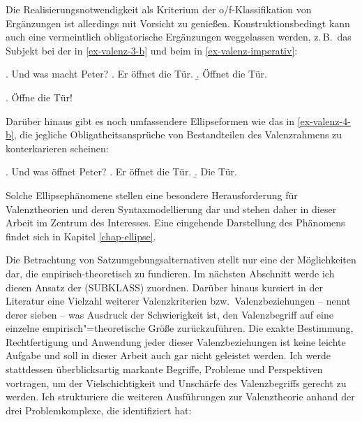 Die Realisierungsnotwendigkeit als Kriterium der o/f-Klassifikation von Ergänzungen ist allerdings mit Vorsicht zu genießen. Konstruktionsbedingt kann auch eine vermeintlich obligatorische Ergänzungen weggelassen werden, z.\,B.\ das Subjekt bei der  in \ref{ex-valenz-3-b} und beim  in \ref{ex-valenz-imperativ}:

\ex. Und was macht Peter? 
\a. Er öffnet die Tür.
\b. Öffnet die Tür.  \label{ex-valenz-3-b}

\ex. Öffne die Tür!\label{ex-valenz-imperativ}

Darüber hinaus gibt es noch umfassendere Ellipseformen wie das  in \ref{ex-valenz-4-b}, die jegliche Obligatheitsansprüche von Bestandteilen des Valenzrahmens zu konterkarieren scheinen:

\ex. Und was öffnet Peter? 
\a. Er öffnet die Tür.
\b. Die Tür. \label{ex-valenz-4-b}

Solche Ellipsephänomene stellen eine besondere Herausforderung für Valenztheorien und deren Syntaxmodellierung dar und stehen daher in dieser Arbeit im Zentrum des  Interesses. Eine eingehende Darstellung des Phänomens findet sich in Kapitel \ref{chap-ellipse}. %

Die Betrachtung von Satzumgebungsalternativen stellt nur eine der Möglichkeiten dar, die  empirisch-theoretisch zu fundieren. Im nächsten Abschnitt werde ich diesen Ansatz der  (SUBKLASS) zuordnen. Darüber hinaus kursiert in der Literatur eine Vielzahl weiterer Valenzkriterien bzw.\ Valenzbeziehungen -- \cite{Jacobs:94} nennt derer sieben -- was Ausdruck der Schwierigkeit ist, den Valenzbegriff auf eine einzelne empirisch"=theoretische Grö\ss e zurückzuführen. Die exakte Bestimmung, Rechtfertigung und Anwendung jeder dieser Valenzbeziehungen ist keine leichte Aufgabe und soll in dieser Arbeit auch gar nicht geleistet werden. Ich werde stattdessen überblicksartig markante Begriffe, Probleme und Perspektiven vortragen, um der Vielschichtigkeit und Unschärfe des Valenzbegriffs gerecht zu werden. Ich strukturiere die weiteren Ausführungen zur Valenztheorie anhand der drei Problemkomplexe, die \citet[23]{Storrer:92} identifiziert hat:

